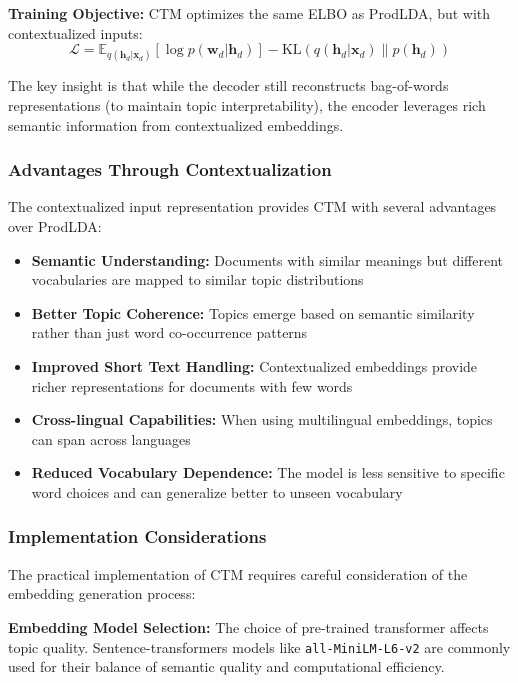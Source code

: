 \documentclass[12pt]{article}
\begin{document}
\textbf{Training Objective:} CTM optimizes the same ELBO as ProdLDA, but with contextualized inputs:
\begin{equation}
    \mathcal{L} = \mathbb{E}_{q(\mathbf{h}_d|\mathbf{x}_d)}[\log p(\mathbf{w}_d|\mathbf{h}_d)] - \text{KL}(q(\mathbf{h}_d|\mathbf{x}_d) \| p(\mathbf{h}_d))
\end{equation}

The key insight is that while the decoder still reconstructs bag-of-words
representations (to maintain topic interpretability), the encoder leverages
rich semantic information from contextualized embeddings.

\subsubsection{Advantages Through Contextualization}
The contextualized input representation provides CTM with several advantages
over ProdLDA:

\begin{itemize}
    \item \textbf{Semantic Understanding:} Documents with similar meanings but different vocabularies are mapped to similar topic distributions
    \item \textbf{Better Topic Coherence:} Topics emerge based on semantic similarity rather than just word co-occurrence patterns
    \item \textbf{Improved Short Text Handling:} Contextualized embeddings provide richer representations for documents with few words
    \item \textbf{Cross-lingual Capabilities:} When using multilingual embeddings, topics can span across languages
    \item \textbf{Reduced Vocabulary Dependence:} The model is less sensitive to specific word choices and can generalize better to unseen vocabulary
\end{itemize}

\subsubsection{Implementation Considerations}
The practical implementation of CTM requires careful consideration of the
embedding generation process:

\textbf{Embedding Model Selection:} The choice of pre-trained transformer affects topic quality. Sentence-transformers models like \texttt{all-MiniLM-L6-v2} are commonly used for their balance of semantic quality and computational efficiency.
\end{document}
